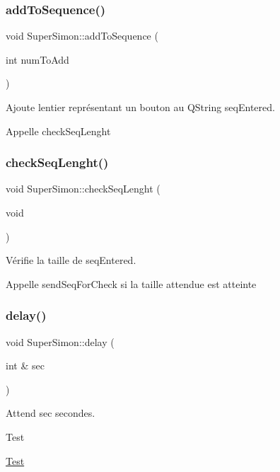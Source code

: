 \subsubsection{\texorpdfstring{add\+To\+Sequence()}{addToSequence()}}
{\footnotesize\ttfamily void Super\+Simon\+::add\+To\+Sequence (\begin{DoxyParamCaption}\item[{int}]{num\+To\+Add }\end{DoxyParamCaption})}



Ajoute l\textquotesingle{}entier représentant un bouton au Q\+String seq\+Entered. 

Appelle check\+Seq\+Lenght \mbox{\label{class_super_simon_a4ea2f32b57775bd2c784472369127bcf}} 
\subsubsection{\texorpdfstring{check\+Seq\+Lenght()}{checkSeqLenght()}}
{\footnotesize\ttfamily void Super\+Simon\+::check\+Seq\+Lenght (\begin{DoxyParamCaption}\item[{void}]{ }\end{DoxyParamCaption})}



Vérifie la taille de seq\+Entered. 

Appelle send\+Seq\+For\+Check si la taille attendue est atteinte \mbox{\label{class_super_simon_af12663f8a26a971a508a40a33d0afceb}} 
\subsubsection{\texorpdfstring{delay()}{delay()}}
{\footnotesize\ttfamily void Super\+Simon\+::delay (\begin{DoxyParamCaption}\item[{int \&}]{sec }\end{DoxyParamCaption})}



Attend sec secondes. 

\begin{DoxyRefDesc}{Test}
\item[\hyperlink{test__test000004}{Test}]\end{DoxyRefDesc}
\mbox{\label{class_super_simon_af00408823847e80a511019baa536afb3}} 
